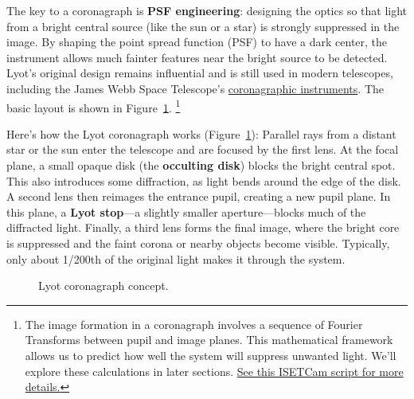 \documentclass[
  letterpaper,
]{book}
\begin{document}
The key to a coronagraph is \textbf{PSF engineering}: designing the
optics so that light from a bright central source (like the sun or a
star) is strongly suppressed in the image. By shaping the point spread
function (PSF) to have a dark center, the instrument allows much fainter
features near the bright source to be detected. Lyot's original design
remains influential and is still used in modern telescopes, including
the James Webb Space Telescope's
\href{https://jwst-docs.stsci.edu/jwst-mid-infrared-instrument/miri-instrumentation/miri-coronagraphs\#gsc.tab=0}{coronagraphic
instruments}. The basic layout is shown in Figure~\ref{fig-optics-lyot}.
\footnote{The image formation in a coronagraph involves a sequence of
  Fourier Transforms between pupil and image planes. This mathematical
  framework allows us to predict how well the system will suppress
  unwanted light. We'll explore these calculations in later sections.
  \href{https://chatgpt.com/share/6892d701-54d0-8002-8137-ec17287ab549}{See
  this ISETCam script for more details.}}

Here's how the Lyot coronagraph works (Figure~\ref{fig-optics-lyot}):
Parallel rays from a distant star or the sun enter the telescope and are
focused by the first lens. At the focal plane, a small opaque disk (the
\textbf{occulting disk}) blocks the bright central spot. This also
introduces some diffraction, as light bends around the edge of the disk.
A second lens then reimages the entrance pupil, creating a new pupil
plane. In this plane, a \textbf{Lyot stop}---a slightly smaller
aperture---blocks much of the diffracted light. Finally, a third lens
forms the final image, where the bright core is suppressed and the faint
corona or nearby objects become visible. Typically, only about 1/200th
of the original light makes it through the system.

\begin{figure}


\caption{\label{fig-optics-lyot}Lyot coronagraph concept.}

\end{figure}%
\end{document}
